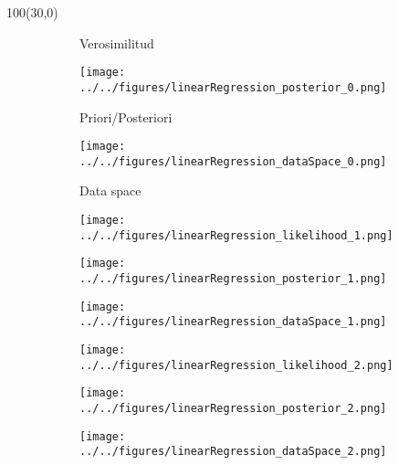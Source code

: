 \documentclass[shownotes,aspectratio=169]{beamer}
\begin{document}
\begin{frame}[plain]
 \begin{textblock}{100}(30,0)
 \begin{figure}
\begin{subfigure}[t]{0.32\textwidth} 
\caption*{Verosimilitud} 
\end{subfigure}
\begin{subfigure}[t]{0.32\textwidth}
\caption*{Priori/Posteriori} 
\texttt{[image: ../../figures/linearRegression\_posterior\_0.png]} 
\end{subfigure}
\begin{subfigure}[t]{0.32\textwidth}
\caption*{Data space} 
\texttt{[image: ../../figures/linearRegression\_dataSpace\_0.png]} 
\end{subfigure}


\begin{subfigure}[c]{0.32\textwidth}
\texttt{[image: ../../figures/linearRegression\_likelihood\_1.png]} 
\end{subfigure}
\begin{subfigure}[c]{0.32\textwidth}
\texttt{[image: ../../figures/linearRegression\_posterior\_1.png]} 
\end{subfigure}
\begin{subfigure}[c]{0.32\textwidth}
\texttt{[image: ../../figures/linearRegression\_dataSpace\_1.png]} 
\end{subfigure}

\begin{subfigure}[c]{0.32\textwidth}
\texttt{[image: ../../figures/linearRegression\_likelihood\_2.png]} 
\end{subfigure}
\begin{subfigure}[c]{0.32\textwidth}
\texttt{[image: ../../figures/linearRegression\_posterior\_2.png]} 
\end{subfigure}
\begin{subfigure}[c]{0.32\textwidth}
\texttt{[image: ../../figures/linearRegression\_dataSpace\_2.png]} 
\end{subfigure}

\end{figure}
\end{textblock}

\end{frame}
\end{document}
